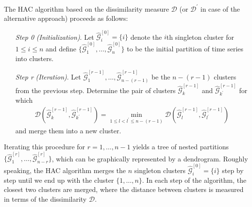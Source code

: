 \documentclass[a4paper,12pt]{article}
\numberwithin{equation}{section}
\begin{document}
The HAC algorithm based on the dissimilarity measure $\mathcal{D}$ (or $\mathcal{D}^\prime$ in case of the alternative approach) proceeds as follows:
\begin{itemize}[leftmargin=1.4cm]

\item[\textit{Step 0}] \textit{(Initialization)}. Let $\hat{\mathcal{G}}_i^{[0]} = \{i\}$ denote the $i$th singleton cluster for $1 \leq i \leq n$ and define $\{\hat{\mathcal{G}}_1^{[0]}, \ldots, \hat{\mathcal{G}}_n^{[0]}\}$ to be the
initial partition of time series into clusters.

\item[\textit{Step r}] \textit{(Iteration)}. Let $\hat{\mathcal{G}}^{[r-1]}_1, \ldots, \hat{\mathcal{G}}^{[r-1]}_{n - (r-1)}$ be the $n-(r-1)$ clusters from the previous step. Determine the pair of clusters $\hat{\mathcal{G}}^{[r-1]}_k$ and $\hat{\mathcal{G}}^{[r-1]}_{k^\prime}$ for which 
\begin{align*}
\mathcal{D}(\hat{\mathcal{G}}^{[r-1]}_{k}, \hat{\mathcal{G}}^{[r-1]}_{k^\prime}) = \min_{1 \leq l < l^\prime \leq n- (r-1)} \mathcal{D}(\hat{\mathcal{G}}^{[r-1]}_{l}, \hat{\mathcal{G}}^{[r-1]}_{l^\prime})
\end{align*}
and merge them into a new cluster.

\end{itemize}
Iterating this procedure for $r = 1, \ldots, n-1$ yields a tree of nested partitions $\{\hat{\mathcal{G}}^{[r]}_1, \ldots, \hat{\mathcal{G}}^{[r]}_{n-r} \}$, which can be graphically represented by a dendrogram. Roughly speaking, the HAC algorithm merges the $n$ singleton clusters $\hat{\mathcal{G}}^{[0]}_i = \{i\}$ step by step until we end up with the cluster $\{1, \ldots, n\}$. In each step of the algorithm, the closest two clusters are merged, where the distance between clusters is measured in terms of the dissimilarity $\mathcal{D}$. %

\vspace{10pt}
\end{document}
